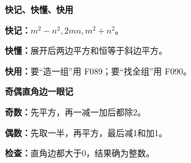 \clearpage
\begin{summarybox}
\textbf{\textcolor{CSummary}{快记、快懂、快用}}
\par\medskip
\begin{center}

\end{center}
\medskip
\textbf{快记：}$m^2-n^2,2mn,m^2+n^2$。\par\textbf{快懂：}展开后两边平方和恒等于斜边平方。\par\textbf{快用：}要“造一组”用 F089；要“找全组”用 F090。
\end{summarybox}
\clearpage
\begin{summarybox}
\textbf{\textcolor{CSummary}{奇偶直角边一眼记}}
\par\medskip
\begin{center}

\end{center}
\medskip
\textbf{奇数：}先平方，再一减一加后都除2。\par\textbf{偶数：}先取一半，再平方，最后减1和加1。\par\textbf{检查：}直角边都大于0，结果确为整数。
\end{summarybox}
